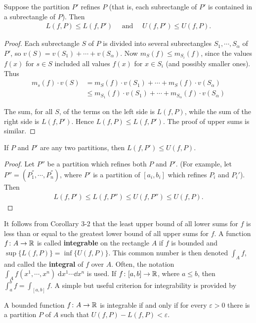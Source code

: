 \begin{lemma}
    Suppose the partition $P'$ refines $P$ (that is, each subrectangle of $P'$
    is contained in a subrectangle of $P$). Then 
    \begin{align*}
        L(f, P) \le L(f, P') \quad\text{ and }\quad U(f, P') \le U(f, P).
    \end{align*}
    \label{lemma3-1}
\end{lemma}
\begin{proof}
    Each subrectangle $S$ of $P$ is divided into several subrectangles $S_1, \cdots, S_\alpha$ of 
    $P'$, so $v(S) = v(S_1) + \cdots +v(S_\alpha)$. Now $m_S(f)\le m_{S_i}(f)$, since the values 
    $f(x)$ for $s\in S$ included all values $f(x)$ for $x\in S_i$ (and possibly smaller ones).
    Thus 
    \begin{align*}
        m_s(f)\cdot v(S) 
        & = m_S(f)\cdot v(S_1) + \cdots + m_S(f)\cdot v(S_\alpha)\\
        & \le m_{S_1}(f)\cdot v(S_1) + \cdots + m_{S_\alpha}(f)\cdot v(S_\alpha)
    \end{align*}

    The sum, for all $S$, of the terms on the left side is $L(f, P)$, while 
    the sum of the right side is $L(f, P')$. Hence $L(f, P)\le L(f, P')$. The 
    proof of upper sums is similar. 
\end{proof}


\begin{corollary}
    If $P$ and $P'$ are any two partitions, then $L(f,P') \le U(f,P)$.
    \label{corollary3-2}
\end{corollary}

\begin{proof}
    Let $P''$ be a partition which refines both $P$ and $P'$.
    (For example, let $P'' = (P_1^{''}, \cdots, P_n^{''})$, where $P'$ is a 
    partition of $[a_i, b_i]$ which refines $P_i$ and $P_i'$). Then 
    \begin{align*}
        L(f, P') \le L(f, P'') \le U(f, P'') \le U(f, P).
    \end{align*}
\end{proof}

It follows from Corollary 3-2 that the least upper bound of
all lower sums for $f$ is less than or equal to the greatest lower
bound of all upper sums for $f$. A function $f\colon{}A \to \mathbb{R}$ is called \textbf{integrable} 
on the rectangle $A$ if $f$ is bounded and $\sup\{L(f,P)\} = \inf \{U(f, P)\}$. 
This common number is then denoted $\int_{A }^{}{f}$, and called the \textbf{integral} of 
$f$ over $A$. Often, the notation $\int_{A  }^{}{f(x^1, \cdots, x^n)  \;\mathrm{d}x^1\cdots \dd x^n}$ 
is used. If $f\colon{}[a, b]\to \mathbb{R}$, where $a\le b$, then $\int_{a  }^{b }{f} = \int_{[a, b ]}^{}{f}$.
A simple but useful criterion for integrability is provided by 
\begin{theorem}
    A bounded function $f\colon{}A\to \mathbb{R}$ is integrable if and only if for every $\varepsilon>0$ 
    there is a partition $P$ of $A$ such that $U(f, P) - L(f, P)< \varepsilon$.
\end{theorem}

